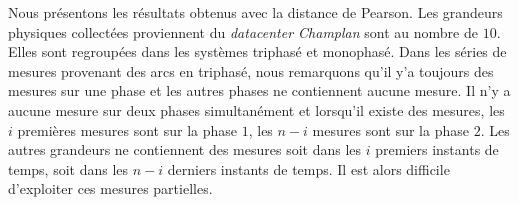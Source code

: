 


Nous pr\'esentons les r\'esultats obtenus avec la distance de Pearson.
\newline
Les grandeurs physiques collect\'ees proviennent du {\em datacenter Champlan} sont au nombre de $10$. Elles sont regroup\'ees dans les syst\`emes triphas\'e et monophas\'e.
Dans les s\'eries de mesures  provenant des arcs en triphas\'e, nous remarquons qu'il y'a toujours des mesures sur une phase et les autres phases ne contiennent aucune mesure. Il n'y a aucune mesure sur deux phases simultan\'ement et lorsqu'il  existe des mesures, les $i$ premi\`eres mesures sont sur la phase $1$, les $n-i$ mesures sont sur la phase $2$. 
Les autres grandeurs ne contiennent des mesures 
soit dans les $i$ premiers instants de temps, 
soit dans les $n-i$ derniers instants de temps. 
Il est alors difficile d'exploiter ces mesures partielles.
